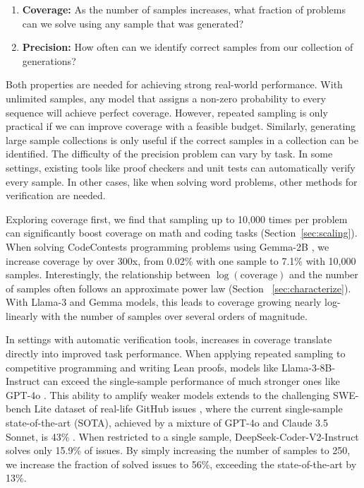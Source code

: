 \documentclass[11pt]{article}
\begin{document}
\begin{enumerate}
    \item \textbf{Coverage:} As the number of samples increases, what fraction of problems can we solve using any sample that was generated?
    \item \textbf{Precision:} How often can we identify correct samples from our collection of generations?
\end{enumerate}

Both properties are needed for achieving strong real-world performance. With unlimited samples, any model that assigns a non-zero probability to every sequence will achieve perfect coverage. However, repeated sampling is only practical if we can improve coverage with a feasible budget. Similarly, generating large sample collections is only useful if the correct samples in a collection can be identified. The difficulty of the precision problem can vary by task. In some settings, existing tools like proof checkers and unit tests can automatically verify every sample. In other cases, like when solving word problems, other methods for verification are needed.

Exploring coverage first, we find that sampling up to 10,000 times per problem can significantly boost coverage on math and coding tasks (Section~\ref{sec:scaling}).
When solving CodeContests \citep{Li_2022} programming problems using Gemma-2B \citep{gemmateam2024gemmaopenmodelsbased}, we increase coverage by over 300x, from 0.02\% with one sample to 7.1\% with 10,000 samples.  
Interestingly, the relationship between $\log(\text{coverage})$ and the number of samples often follows an approximate power law (Section ~\ref{sec:characterize}). With Llama-3 \citep{metallama} and Gemma models, this leads to coverage growing nearly log-linearly with the number of samples over several orders of magnitude.

In settings with automatic verification tools, increases in coverage translate directly into improved task performance. 
When applying repeated sampling to competitive programming and writing Lean proofs, models like Llama-3-8B-Instruct can exceed the single-sample performance of much stronger ones like GPT-4o \citep{gpt4o}. This ability to amplify weaker models extends to the challenging SWE-bench Lite dataset of real-life GitHub issues \citep{jimenez2024swebenchlanguagemodelsresolve}, where the current single-sample state-of-the-art (SOTA), achieved by a mixture of GPT-4o and Claude 3.5 Sonnet, is 43\% \citep{aide}. When restricted to a single sample, DeepSeek-Coder-V2-Instruct \citep{deepseekai2024deepseekv2strongeconomicalefficient} solves only 15.9\% of issues. 
By simply increasing the number of samples to 250, we increase the fraction of solved issues to 56\%, exceeding the state-of-the-art by 13\%. 
\end{document}
